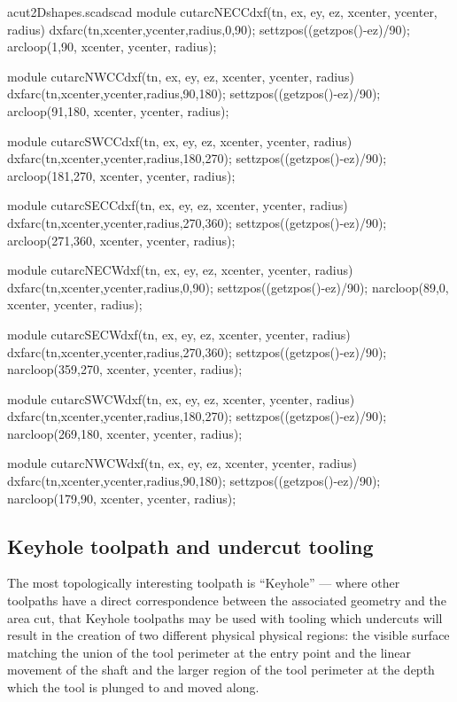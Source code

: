 \documentclass{ltxdoc}
\begin{document}
\lstset{firstnumber=\thecuttwod}
\begin{writecode}{a}{cut2Dshapes.scad}{scad}
module cutarcNECCdxf(tn, ex, ey, ez, xcenter, ycenter, radius) {
  dxfarc(tn,xcenter,ycenter,radius,0,90);
  settzpos((getzpos()-ez)/90);
    arcloop(1,90, xcenter, ycenter, radius);
}

module cutarcNWCCdxf(tn, ex, ey, ez, xcenter, ycenter, radius) {
  dxfarc(tn,xcenter,ycenter,radius,90,180);
  settzpos((getzpos()-ez)/90);
    arcloop(91,180, xcenter, ycenter, radius);
}

module cutarcSWCCdxf(tn, ex, ey, ez, xcenter, ycenter, radius) {
  dxfarc(tn,xcenter,ycenter,radius,180,270);
  settzpos((getzpos()-ez)/90);
    arcloop(181,270, xcenter, ycenter, radius);
}

module cutarcSECCdxf(tn, ex, ey, ez, xcenter, ycenter, radius) {
  dxfarc(tn,xcenter,ycenter,radius,270,360);
  settzpos((getzpos()-ez)/90);
    arcloop(271,360, xcenter, ycenter, radius);
}

module cutarcNECWdxf(tn, ex, ey, ez, xcenter, ycenter, radius) {
  dxfarc(tn,xcenter,ycenter,radius,0,90);
  settzpos((getzpos()-ez)/90);
    narcloop(89,0, xcenter, ycenter, radius);
}

module cutarcSECWdxf(tn, ex, ey, ez, xcenter, ycenter, radius) {
  dxfarc(tn,xcenter,ycenter,radius,270,360);
  settzpos((getzpos()-ez)/90);
    narcloop(359,270, xcenter, ycenter, radius);
}

module cutarcSWCWdxf(tn, ex, ey, ez, xcenter, ycenter, radius) {
  dxfarc(tn,xcenter,ycenter,radius,180,270);
  settzpos((getzpos()-ez)/90);
    narcloop(269,180, xcenter, ycenter, radius);
}

module cutarcNWCWdxf(tn, ex, ey, ez, xcenter, ycenter, radius) {
  dxfarc(tn,xcenter,ycenter,radius,90,180);
  settzpos((getzpos()-ez)/90);
    narcloop(179,90, xcenter, ycenter, radius);
}

\end{writecode}
\addtocounter{cuttwod}{48}
 
\subsection{Keyhole toolpath and undercut tooling}
 
\label{subsec:keyholetoolpaths}
The most topologically interesting toolpath is ``Keyhole'' --- where other toolpaths have a 
direct correspondence between the associated geometry and the area cut, that Keyhole toolpaths
may be used with tooling which undercuts will result in the creation of two different physical
physical regions: the visible surface matching the union of the tool perimeter at the entry point
and the linear movement of the shaft and the larger region of the tool perimeter at the depth
which the tool is plunged to and moved along.
 
\end{document}
